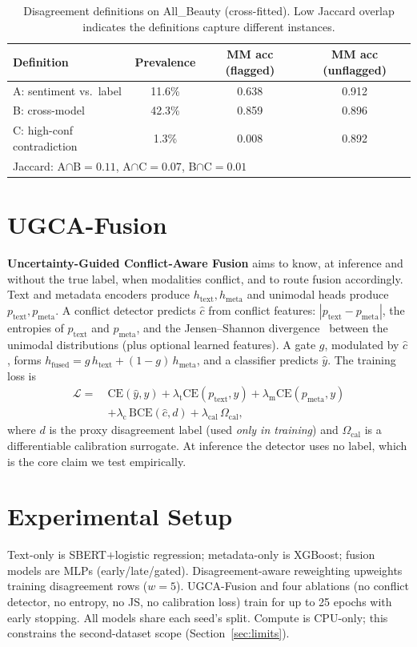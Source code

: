 \documentclass[11pt]{article}
\begin{document}
\begin{table}[t]\centering
\caption{Disagreement definitions on All\_Beauty (cross-fitted). Low Jaccard
overlap indicates the definitions capture different instances.}
\label{tab:defs}
\begin{tabular}{lccc}
\toprule
Definition & Prevalence & MM acc (flagged) & MM acc (unflagged)\\
\midrule
A: sentiment vs.\ label & 11.6\% & 0.638 & 0.912\\
B: cross-model & 42.3\% & 0.859 & 0.896\\
C: high-conf contradiction & 1.3\% & 0.008 & 0.892\\
\midrule
\multicolumn{4}{l}{Jaccard: A$\cap$B$=0.11$, A$\cap$C$=0.07$, B$\cap$C$=0.01$}\\
\bottomrule
\end{tabular}
\end{table}

\section{UGCA-Fusion}\label{sec:method}
\textbf{Uncertainty-Guided Conflict-Aware Fusion} aims to know, at inference and
without the true label, when modalities conflict, and to route fusion
accordingly. Text and metadata encoders produce $h_{\text{text}}, h_{\text{meta}}$
and unimodal heads produce $p_{\text{text}}, p_{\text{meta}}$. A conflict
detector predicts $\hat{c}$ from conflict features:
$|p_{\text{text}}-p_{\text{meta}}|$, the entropies of $p_{\text{text}}$ and
$p_{\text{meta}}$, and the Jensen--Shannon divergence~\citep{lin1991divergence}
between the unimodal distributions (plus optional learned features). A gate $g$,
modulated by $\hat{c}$, forms
$h_{\text{fused}} = g\,h_{\text{text}} + (1-g)\,h_{\text{meta}}$, and a classifier
predicts $\hat{y}$. The training loss is
\begin{align*}
\mathcal{L} =\ & \mathrm{CE}(\hat y, y)
+ \lambda_{\text{t}}\mathrm{CE}(p_{\text{text}}, y)
+ \lambda_{\text{m}}\mathrm{CE}(p_{\text{meta}}, y)\\
&+ \lambda_{\text{c}}\,\mathrm{BCE}(\hat c, d)
+ \lambda_{\text{cal}}\,\Omega_{\text{cal}},
\end{align*}
where $d$ is the proxy disagreement label (used \emph{only in training}) and
$\Omega_{\text{cal}}$ is a differentiable calibration surrogate. At inference the
detector uses no label, which is the core claim we test empirically.

\section{Experimental Setup}\label{sec:exp}
Text-only is SBERT${+}$logistic regression; metadata-only is XGBoost; fusion
models are MLPs (early/late/gated). Disagreement-aware reweighting upweights
training disagreement rows ($w{=}5$). UGCA-Fusion and four ablations
(no conflict detector, no entropy, no JS, no calibration loss) train for up to
25 epochs with early stopping. All models share each seed's split. Compute is
CPU-only; this constrains the second-dataset scope (Section~\ref{sec:limits}).
\end{document}
